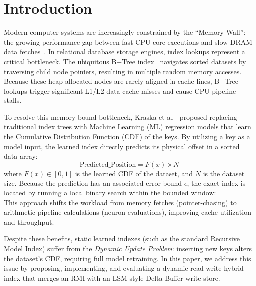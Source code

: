 \documentclass[sigconf, nonacm]{acmart}
\begin{document}
\maketitle

\vldbtopmatter

\section{Introduction}
Modern computer systems are increasingly constrained by the ``Memory Wall'': the growing performance gap between fast CPU core executions and slow DRAM data fetches~\cite{wulf1995hitting, hennessy2011computer}. In relational database storage engines, index lookups represent a critical bottleneck. The ubiquitous B+Tree index~\cite{comer1979ubiquitous} navigates sorted datasets by traversing child node pointers, resulting in multiple random memory accesses. Because these heap-allocated nodes are rarely aligned in cache lines, B+Tree lookups trigger significant L1/L2 data cache misses and cause CPU pipeline stalls.

To resolve this memory-bound bottleneck, Kraska et al.~\cite{kraska2018case} proposed replacing traditional index trees with Machine Learning (ML) regression models that learn the Cumulative Distribution Function (CDF) of the keys. By utilizing a key as a model input, the learned index directly predicts its physical offset in a sorted data array:
\begin{equation}
    \text{Predicted\_Position} = F(x) \times N
\end{equation}
where $F(x) \in [0,1]$ is the learned CDF of the dataset, and $N$ is the dataset size. Because the prediction has an associated error bound $\epsilon$, the exact index is located by running a local binary search within the bounded window:
\begin{equation}
    [\text{Predicted\_Position} - \epsilon, \text{Predicted\_Position} + \epsilon]
\end{equation}
This approach shifts the workload from memory fetches (pointer-chasing) to arithmetic pipeline calculations (neuron evaluations), improving cache utilization and throughput. 

Despite these benefits, static learned indexes (such as the standard Recursive Model Index) suffer from the \textit{Dynamic Update Problem}: inserting new keys alters the dataset's CDF, requiring full model retraining. In this paper, we address this issue by proposing, implementing, and evaluating a dynamic read-write hybrid index that merges an RMI with an LSM-style Delta Buffer write store.
\end{document}
